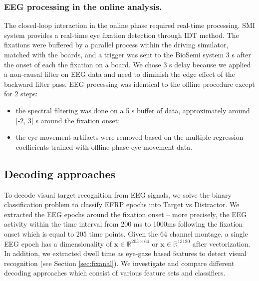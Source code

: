 \documentclass[12pt]{iopart}
\begin{document}
\subsubsection*{EEG processing in the online analysis.}
The closed-loop interaction in the online phase required real-time processing.
SMI system provides
a real-time eye fixation detection through IDT method. The fixations were buffered
by a parallel process within the driving simulator, matched with the boards,
and a trigger was sent to the BioSemi system 3 s after the onset of each the fixation
on a board. We chose 3 s delay because we applied a non-causal filter on EEG data
and need to diminish the edge effect of the backward filter pass.
EEG processing  was identical to the offline procedure
except for 2 steps:
\begin{itemize}
    \item the spectral filtering was done on a 5 s buffer of data,
        approximately around [-2, 3] s around the fixation onset;
    \item the eye movement artifacts were removed based on the multiple
        regression coefficients trained with offline phase eye movement data.
\end{itemize}

\subsection{Decoding approaches}
To decode visual target recognition from EEG signals,
we solve the binary classification problem to classify EFRP epochs
into Target vs Distractor. We extracted the EEG epochs
around the fixation onset -- more precisely, the EEG activity within the time interval from
200 ms to 1000ms following the fixation onset which is equal to 205 time points.
Given the 64 channel montage, a single EEG epoch has a dimensionality of 
$\mathbf{x} \in \mathbb{R}^{205 \times 64}$ or
$\mathbf{x} \in \mathbb{R}^{13120}$ after vectorization.
In addition, we extracted dwell time as eye-gaze based features to detect
visual recognition (see Section \ref{sec:fixanal}).
We investigate and compare different decoding approaches which consist of 
various feature sets and classifiers.
\end{document}
